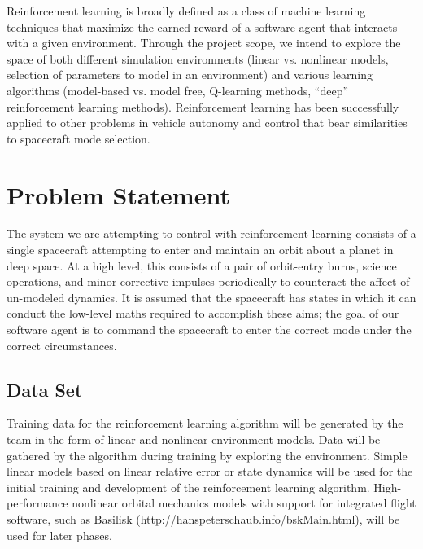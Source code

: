 \documentclass[]{article}
\begin{document}
Reinforcement learning is broadly defined as a class of machine learning techniques that maximize the earned reward of a software agent that interacts with a given environment. Through the project scope, we intend to explore the space of both different simulation environments (linear vs. nonlinear models, selection of parameters to model in an environment) and various learning algorithms (model-based vs. model free, Q-learning methods, ``deep'' reinforcement learning methods). Reinforcement learning has been successfully applied to other problems in vehicle autonomy and control that bear similarities to spacecraft mode selection.

\section{Problem Statement}
The system we are attempting to control with reinforcement learning consists of a single spacecraft attempting to enter and maintain an orbit about a planet in deep space. At a high level, this consists of a pair of orbit-entry burns, science operations, and minor corrective impulses periodically to counteract the affect of un-modeled dynamics. It is assumed that the spacecraft has states in which it can conduct the low-level maths required to accomplish these aims; the goal of our software agent is to command the spacecraft to enter the correct mode under the correct circumstances. 


\subsection{Data Set}

Training data for the reinforcement learning algorithm will be generated by the team in the form of linear and nonlinear environment models. Data will be gathered by the algorithm during training by exploring the environment. Simple linear models based on linear relative error or state dynamics will be used for the initial training and development of the reinforcement learning algorithm. High-performance nonlinear orbital mechanics models with support for integrated flight software, such as Basilisk (http://hanspeterschaub.info/bskMain.html), will be used for later phases.
\end{document}
